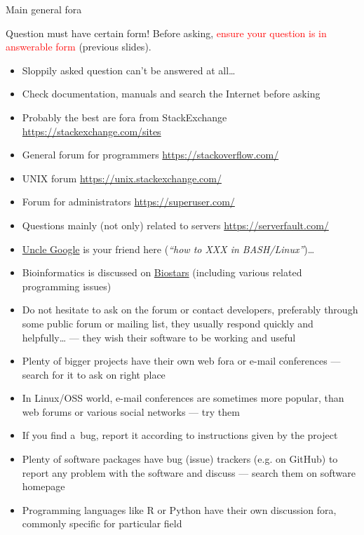 \documentclass[compress, ucs, xelatex, 11pt, xcolor=svgnames, aspectratio=169,
	hyperref={
		bookmarks=true,
		unicode=true,
		colorlinks=true,
		pdftitle={Linux, command line and MetaCentrum},
		plainpages=false,
		pdfauthor={Vojtech Zeisek},
		pdfsubject={Course about use of Linux command line, writing shell scripts and using MetaCentrum of CESNET},
		pdfcreator={XeLaTeX},
		pdfkeywords={Linux, GNU, BASH, shell, command line, MetaCentrum},
		linkcolor=DarkRed, %
		anchorcolor=DarkBlue, %
		citecolor=Indigo, %
		filecolor=NavyBlue, %
		menucolor=DarkMagenta, %
		urlcolor=DarkBlue, %
		pdftex},
	url={hyphens, lowtilde} %
	]{beamer}
\renewcommand{\alert}[1]{\textcolor{red}{#1}}
\begin{document}
\begin{frame}[allowframebreaks]{Main general fora}
	\begin{block}{Question must have certain form!}
			Before asking, \alert{ensure your question is in answerable form} (previous slides).
		\begin{itemize}
			\item Sloppily asked question can't be answered at all\ldots
			\item Check documentation, manuals and search the Internet before asking
		\end{itemize}
	\end{block}
	\begin{itemize}
		\item Probably the best are fora from StackExchange \url{https://stackexchange.com/sites}
		\item General forum for programmers \url{https://stackoverflow.com/}
		\item UNIX forum \url{https://unix.stackexchange.com/}
		\item Forum for administrators \url{https://superuser.com/}
		\item Questions mainly (not only) related to servers \url{https://serverfault.com/}
		\item \href{https://www.startpage.com/}{Uncle Google} is your friend here (\textit{\enquote{how to XXX in BASH/Linux}})\ldots
		\item Bioinformatics is discussed on \href{https://www.biostars.org/}{Biostars} (including various related programming issues)
		\item Do not hesitate to ask on the forum or contact developers, preferably through some public forum or mailing list, they usually respond quickly and helpfully\ldots{ }--- they wish their software to be working and useful
		\item Plenty of bigger projects have their own web fora or e-mail conferences --- search for it to ask on right place
		\item In Linux/OSS world, e-mail conferences are sometimes more popular, than web forums or various social networks --- try them
		\item If you find a~bug, report it according to instructions given by the project
		\item Plenty of software packages have bug (issue) trackers (e.g. on GitHub) to report any problem with the software and discuss --- search them on software homepage
		\item Programming languages like R or Python have their own discussion fora, commonly specific for particular field
	\end{itemize}
\end{frame}
\end{document}

